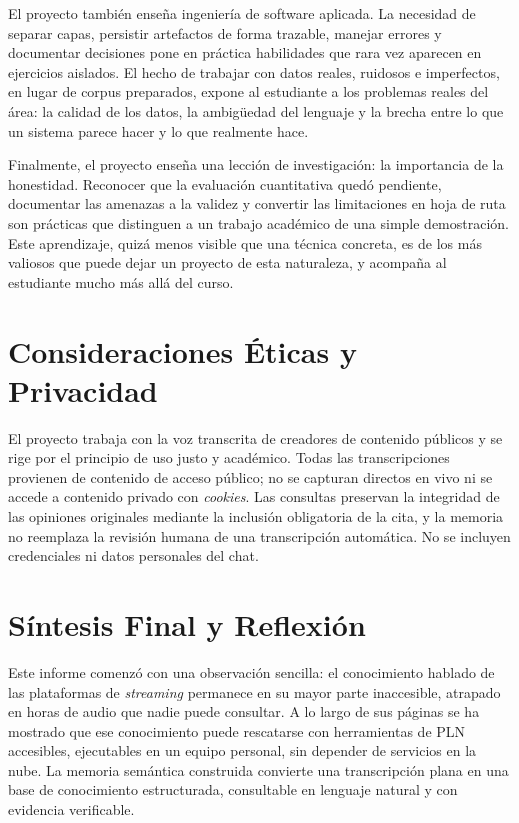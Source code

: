 \documentclass[12pt,a4paper]{article}
\begin{document}
El proyecto también enseña ingeniería de software aplicada. La necesidad de separar capas, persistir artefactos de forma trazable, manejar errores y documentar decisiones pone en práctica habilidades que rara vez aparecen en ejercicios aislados. El hecho de trabajar con datos reales, ruidosos e imperfectos, en lugar de corpus preparados, expone al estudiante a los problemas reales del área: la calidad de los datos, la ambigüedad del lenguaje y la brecha entre lo que un sistema parece hacer y lo que realmente hace.

Finalmente, el proyecto enseña una lección de investigación: la importancia de la honestidad. Reconocer que la evaluación cuantitativa quedó pendiente, documentar las amenazas a la validez y convertir las limitaciones en hoja de ruta son prácticas que distinguen a un trabajo académico de una simple demostración. Este aprendizaje, quizá menos visible que una técnica concreta, es de los más valiosos que puede dejar un proyecto de esta naturaleza, y acompaña al estudiante mucho más allá del curso.


\section{Consideraciones Éticas y Privacidad}
\label{sec:etica}

El proyecto trabaja con la voz transcrita de creadores de contenido públicos y se rige por el principio de uso justo y académico. Todas las transcripciones provienen de contenido de acceso público; no se capturan directos en vivo ni se accede a contenido privado con \emph{cookies}. Las consultas preservan la integridad de las opiniones originales mediante la inclusión obligatoria de la cita, y la memoria no reemplaza la revisión humana de una transcripción automática. No se incluyen credenciales ni datos personales del chat.


\section{Síntesis Final y Reflexión}
\label{sec:cierre}

Este informe comenzó con una observación sencilla: el conocimiento hablado de las plataformas de \emph{streaming} permanece en su mayor parte inaccesible, atrapado en horas de audio que nadie puede consultar. A lo largo de sus páginas se ha mostrado que ese conocimiento puede rescatarse con herramientas de PLN accesibles, ejecutables en un equipo personal, sin depender de servicios en la nube. La memoria semántica construida convierte una transcripción plana en una base de conocimiento estructurada, consultable en lenguaje natural y con evidencia verificable.
\end{document}
